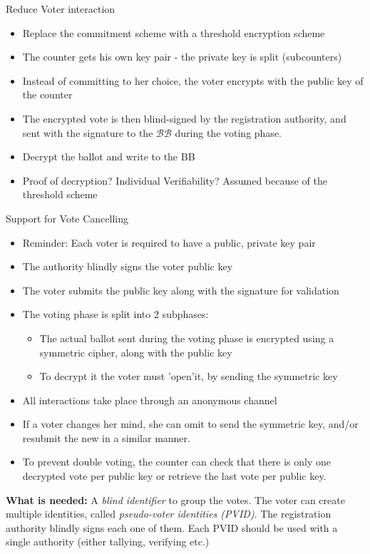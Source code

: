 \documentclass{beamer}
\newcommand{\bb}{ \mathcal{B}\mathcal{B}   }
\begin{document}
\begin{frame}[allowframebreaks]{Reduce Voter interaction \cite{OMAFO}}
\begin{itemize}
\item Replace the commitment scheme with a threshold encryption scheme
\item The counter gets his own key pair - the private key is split (subcounters)
\item Instead of committing to her choice, the voter encrypts with the public key of the counter
\item The encrypted vote is then blind-signed by the registration authority, and sent with the signature to the $\bb$ during the voting phase.
\item Decrypt the ballot and write to the BB
\item Proof of decryption? Individual Verifiability? Assumed because of the threshold scheme
\end{itemize}  
\end{frame}

\begin{frame}[allowframebreaks]{Support for Vote Cancelling \cite{hesu98}}
\begin{itemize}
\item Reminder: Each voter is required to have a public, private key pair
\item The authority blindly signs the voter public key
\item The voter submits the public key along with the signature for validation
\item The voting phase is split into 2 subphases:
\begin{itemize}
\item The actual ballot sent during the voting phase is encrypted using a symmetric cipher, along with the public key
\item To decrypt it the voter must 'open'it, by sending the symmetric key
\end{itemize}
\item All interactions take place through an anonymous channel
\item If a voter changes her mind, she can omit to send the symmetric key, and/or resubmit the new in a similar manner. 
\item To prevent double voting, the counter can check that there is only one decrypted vote per public key or retrieve the last vote per public key.
\end{itemize}  
\textbf{What is needed:} A \textit{blind identifier} to group the votes. 
\cite{Ceti2007} The voter can create multiple identities, called \textit{pseudo-voter identities (PVID)}. The registration authority blindly signs each one of them. Each PVID should be used with a single authority (either tallying, verifying etc.)
\end{frame}
 
\end{document}
